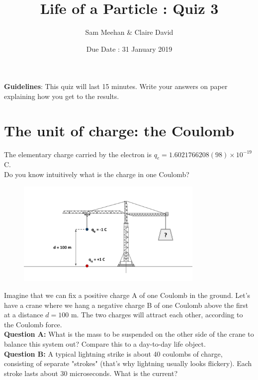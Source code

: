 \documentclass[12pt]{article}
\title{Life of a Particle : Quiz 3}
\author{Sam Meehan \& Claire David}
\date{Due Date : 31 January 2019}
\begin{document}
\maketitle
\vspace{-3ex}
\textbf{Guidelines}:
\newline
This quiz will last 15 minutes. Write your answers on paper explaining how you get to the results. 

\section{The unit of charge: the Coulomb}
The elementary charge carried by the electron is $q_e = 1.6021766208(98) \times 10^{-19}$ C.\\
Do you know intuitively what is the charge in one Coulomb?

\begin{figure}[h]
    \centering
    \includegraphics[width=0.8\textwidth]{Coulomb_quiz.png}
\end{figure}
Imagine that we can fix a positive charge A of one Coulomb in the ground. Let's have a crane where we hang a negative charge B of one Coulomb above the first at a distance $d = 100$ m. The two charges will attract each other, according to the Coulomb force.\\

\textbf{Question A:} What is the mass to be suspended on the other side of the crane to balance this system out? Compare this to a day-to-day life object.\\

\textbf{Question B:} A typical lightning strike is about 40 coulombs of charge, consisting of separate "strokes" (that's why lightning usually looks flickery). Each stroke lasts about 30 microseconds. What is the current?\\
\end{document}
